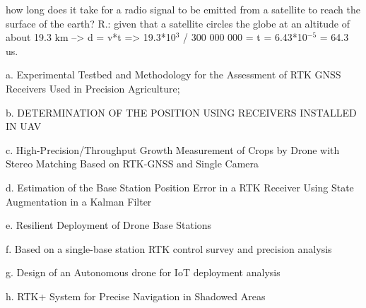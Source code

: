     how long does it take for a radio signal to be emitted from a satellite to reach the surface of the earth? 
    R.: given that a satellite circles the globe at an altitude of about 19.3 km --> d = v*t => 19.3*10$^3$ / 300 000 000 = t = 6.43*10$^{-5}$ = 64.3 us.

a. Experimental Testbed and Methodology for the
Assessment of RTK GNSS Receivers Used
in Precision Agriculture;

b. DETERMINATION OF THE POSITION USING
RECEIVERS INSTALLED IN UAV

c. High-Precision/Throughput Growth Measurement of
Crops by Drone with Stereo Matching Based on
RTK-GNSS and Single Camera

d. Estimation of the Base Station Position Error in a
RTK Receiver Using State Augmentation in a
Kalman Filter

e. Resilient Deployment of Drone Base Stations

f. Based on a single-base station RTK control survey
and precision analysis 

g. Design of an Autonomous drone for IoT deployment
analysis 

h. RTK+ System for Precise Navigation in Shadowed
Areas 
